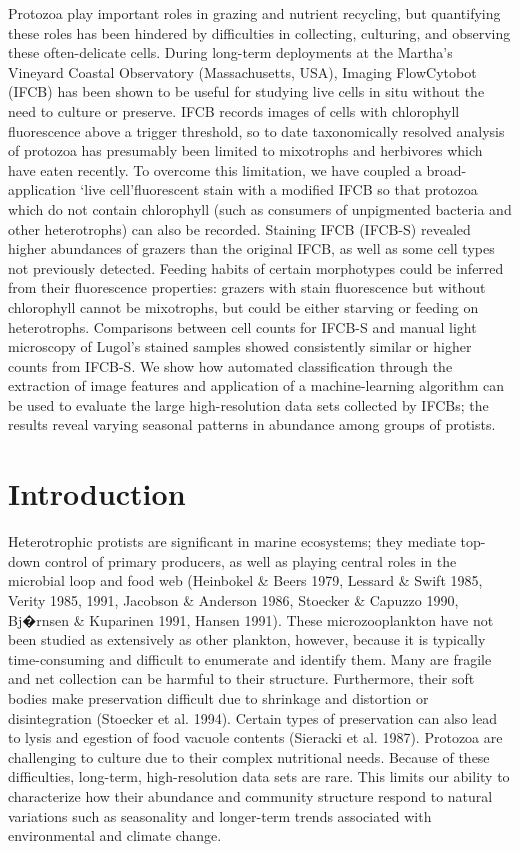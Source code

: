 Protozoa play important roles in grazing and nutrient recycling, but quantifying these roles has been hindered by difficulties in collecting, culturing, and observing these often-delicate cells. During long-term deployments at the Martha's Vineyard Coastal Observatory (Massachusetts,
USA), Imaging FlowCytobot (IFCB) has been shown to be useful for studying live cells in situ without the need to culture or preserve. IFCB records images of cells with chlorophyll fluorescence above a trigger threshold, so to date taxonomically resolved analysis of protozoa has presumably
been limited to mixotrophs and herbivores which have eaten recently. To overcome this limitation, we have coupled a broad-application \lq{live cell}\rq fluorescent stain with a modified IFCB so that protozoa which do not contain chlorophyll (such as consumers of unpigmented bacteria
and other heterotrophs) can also be recorded. Staining IFCB (IFCB-S) revealed higher abundances of grazers than the original IFCB, as well as some cell types not previously detected. Feeding habits of certain morphotypes could be inferred from their fluorescence properties: grazers
with stain fluorescence but without chlorophyll cannot be mixotrophs, but could be either starving or feeding on heterotrophs. Comparisons between cell counts for IFCB-S and manual light microscopy of Lugol's stained samples showed consistently similar or higher counts from IFCB-S.
We show how automated classification through the extraction of image features and application of a machine-learning algorithm can be used to evaluate the large high-resolution data sets collected by IFCBs; the results reveal varying seasonal patterns in abundance among groups of protists.

\section{Introduction}

Heterotrophic protists are significant in marine ecosystems; they mediate top-down control of primary producers, as well as playing central roles in the microbial loop and food web (Heinbokel \& Beers 1979, Lessard \& Swift 1985, Verity 1985, 1991, Jacobson \& Anderson 1986, Stoecker \& Capuzzo 1990, Bj�rnsen \& Kuparinen 1991, Hansen 1991). These microzooplankton have not been studied as extensively as other plankton, however, because it is typically time-consuming and difficult to enumerate and identify them. Many are fragile and net collection can be harmful to their structure. Furthermore, their soft bodies make preservation difficult due to shrinkage and distortion or disintegration (Stoecker et al. 1994). Certain types of preservation can also lead to lysis and egestion of food vacuole contents (Sieracki et al. 1987). Protozoa are challenging to culture due to their complex nutritional needs. Because of these difficulties, long-term, high-resolution data sets are rare. This limits our ability to characterize how their abundance and community structure respond to natural variations such as seasonality and longer-term trends associated with environmental and climate change. 

